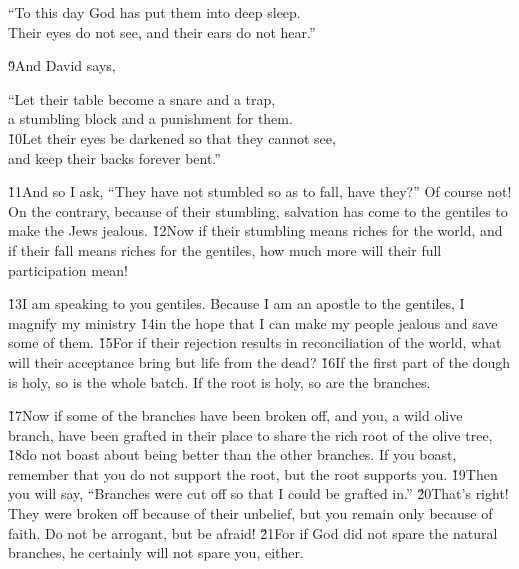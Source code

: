 \begin{poetry}
\poeml ``To this day God has put them into deep sleep. \\
\poemll    Their eyes do not see, and their ears do not hear.''
\end{poetry}

\v{9}And David says,

\begin{poetry}
\poeml ``Let their table become a snare and a trap, \\
\poemll    a stumbling block and a punishment for them. \\
\poeml \v{10}Let their eyes be darkened so that they cannot see, \\
\poemll    and keep their backs forever bent.''
\end{poetry}

\v{11}And so I ask, ``They have not stumbled so as to fall, have they?'' Of course not! On the contrary, because of their stumbling, salvation has come to the gentiles to make the Jews jealous. \v{12}Now if their stumbling means riches for the world, and if their fall means riches for the gentiles, how much more will their full participation mean!

\v{13}I am speaking to you gentiles. Because I am an apostle to the gentiles, I magnify my ministry \v{14}in the hope that I can make my people jealous and save some of them. \v{15}For if their rejection results in reconciliation of the world, what will their acceptance bring but life from the dead? \v{16}If the first part of the dough is holy, so is the whole batch. If the root is holy, so are the branches.

\v{17}Now if some of the branches have been broken off, and you, a wild olive branch, have been grafted in their place to share the rich root of the olive tree, \v{18}do not boast about being better than the other branches. If you boast, remember that you do not support the root, but the root supports you. \v{19}Then you will say, ``Branches were cut off so that I could be grafted in.'' \v{20}That's right! They were broken off because of their unbelief, but you remain only because of faith. Do not be arrogant, but be afraid! \v{21}For if God did not spare the natural branches, he certainly will not spare you, either.

